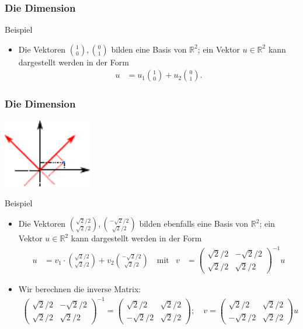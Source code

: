 \documentclass{beamer}
\newcommand\RR{\mathbb R}
\newcommand{\mytitle}{Die Dimension}
\begin{document}
\begin{frame}\frametitle{\mytitle}
	\begin{block}{Beispiel}
	\begin{itemize}
	\item Die Vektoren $\binom10,\binom01$ bilden eine Basis von $\RR^2$; ein Vektor $u\in\RR^2$ kann dargestellt werden in der Form
		\begin{align*}
			u&=u_1\binom10+u_2\binom01.
		\end{align*}
	\end{itemize}
	\end{block}
\end{frame}

\begin{frame}\frametitle{\mytitle}
	\vspace*{-7mm}
	\hfill\includegraphics[height=30mm]{pics/basis.pdf}
	\begin{block}{Beispiel}
	\begin{itemize}
	\item Die Vektoren $\binom{\sqrt 2/2}{\sqrt 2/2},\binom{-\sqrt 2/2}{\sqrt 2/2}$ bilden ebenfalls eine Basis von $\RR^2$; ein Vektor $u\in\RR^2$ kann dargestellt werden in der Form
			\begin{align*}
				u&=v_1\cdot\binom{\sqrt 2/2}{\sqrt 2/2}+v_2\binom{-\sqrt 2/2}{\sqrt 2/2}\quad\mbox{mit}&
				v&=\begin{pmatrix} \sqrt 2/2&-\sqrt 2/2\\\sqrt 2/2&\sqrt 2/2 \end{pmatrix}^{-1}u
			\end{align*}
	\item Wir berechnen die inverse Matrix:
		\begin{align*}
			\begin{pmatrix} \sqrt 2/2&-\sqrt 2/2\\\sqrt 2/2&\sqrt 2/2 \end{pmatrix}^{-1}=
			\begin{pmatrix} \sqrt 2/2&\sqrt 2/2\\-\sqrt 2/2&\sqrt 2/2 \end{pmatrix};\quad
\displaystyle v=\begin{pmatrix} \sqrt 2/2&\sqrt 2/2\\-\sqrt 2/2&\sqrt 2/2 \end{pmatrix}u
		\end{align*}
	\end{itemize}
	\end{block}
\end{frame}
\end{document}
